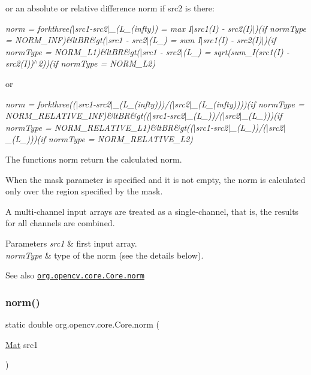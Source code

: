 or an absolute or relative difference norm if {\ttfamily src2} is there\+:

{\itshape norm = forkthree($\vert$src1-\/src2$\vert$\+\_\+(L\+\_\+(infty)) = max {\itshape I$\vert$src1(I) -\/ src2(\+I)$\vert$)(if norm\+Type = N\+O\+R\+M\+\_\+\+I\+NF)\&lt\+BR\&gt($\vert$src1 -\/ src2$\vert$}(L\+\_) = sum {\itshape I$\vert$src1(I) -\/ src2(\+I)$\vert$)(if norm\+Type = N\+O\+R\+M\+\_\+\+L1)\&lt\+BR\&gt($\vert$src1 -\/ src2$\vert$}(L\+\_) = sqrt(sum\+\_\+I(src1(\+I) -\/ src2(\+I))$^\wedge$2))(if norm\+Type = N\+O\+R\+M\+\_\+\+L2)}

or

{\itshape norm = forkthree(($\vert$src1-\/src2$\vert$\+\_\+(L\+\_\+(infty)))/($\vert$src2$\vert$\+\_\+(L\+\_\+(infty))))(if norm\+Type = N\+O\+R\+M\+\_\+\+R\+E\+L\+A\+T\+I\+V\+E\+\_\+\+I\+NF)\&lt\+BR\&gt(($\vert$src1-\/src2$\vert$\+\_\+(L\+\_))/($\vert$src2$\vert$\+\_\+(L\+\_)))(if norm\+Type = N\+O\+R\+M\+\_\+\+R\+E\+L\+A\+T\+I\+V\+E\+\_\+\+L1)\&lt\+BR\&gt(($\vert$src1-\/src2$\vert$\+\_\+(L\+\_))/($\vert$src2$\vert$\+\_\+(L\+\_)))(if norm\+Type = N\+O\+R\+M\+\_\+\+R\+E\+L\+A\+T\+I\+V\+E\+\_\+\+L2)}

The functions {\ttfamily norm} return the calculated norm.

When the {\ttfamily mask} parameter is specified and it is not empty, the norm is calculated only over the region specified by the mask.

A multi-\/channel input arrays are treated as a single-\/channel, that is, the results for all channels are combined.


\begin{DoxyParams}{Parameters}
{\em src1} & first input array. \\
\hline
{\em norm\+Type} & type of the norm (see the details below).\\
\hline
\end{DoxyParams}
\begin{DoxySeeAlso}{See also}
\href{http://docs.opencv.org/modules/core/doc/operations_on_arrays.html#norm}{\tt org.\+opencv.\+core.\+Core.\+norm} 
\end{DoxySeeAlso}
\mbox{\label{classorg_1_1opencv_1_1core_1_1_core_a3ba2adc811656da873ceecb3c4c70335}} 
\subsubsection{\texorpdfstring{norm()}{norm()}\hspace{0.1cm}{\footnotesize\ttfamily [3/6]}}
{\footnotesize\ttfamily static double org.\+opencv.\+core.\+Core.\+norm (\begin{DoxyParamCaption}\item[{\mbox{\hyperlink{classorg_1_1opencv_1_1core_1_1_mat}{Mat}}}]{src1 }\end{DoxyParamCaption})\hspace{0.3cm}{\ttfamily [static]}}

